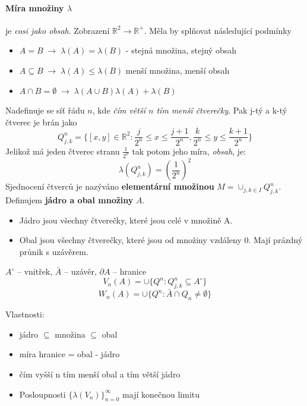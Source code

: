\documentclass[a4paper, twoside,%
12pt]{article}
\newcommand{\R}{\mathbb{R}}
\begin{document}
\paragraph{Míra množiny $\lambda$} je \emph{cosi jako obsah}. Zobrazení $\R^2 \to \R^+$. Měla by splňovat následující podmínky
\begin{itemize}
    \item $A=B\; \rightarrow \; \lambda(A) = \lambda(B)$ - stejná množina, stejný obsah
    \item $A\subseteq B\; \rightarrow \; \lambda(A) \leq \lambda(B)$ menší množina, menší obsah
    \item $A\cap B = \emptyset\; \rightarrow \; \lambda(A\cup B ) \lambda(A) + \lambda(B)$
\end{itemize}
Nadefinuje se síť řádu $n$, kde \emph{čím větší $n$ tím menší čtverečky}. Pak j-tý a k-tý čtverec je brán jako
$$ Q_{j,k}^n = \lbrace [x,y]\in \R^2: \frac{j}{2^n} \leq x \leq \frac{j+1}{2^n}, \frac{k}{2^n} \leq y \leq \frac{k+1}{2^n}\rbrace $$
Jelikož má jeden čtverec stranu $\frac{1}{2^n}$ tak potom jeho míra, \emph{obsah}, je:
$$\lambda(Q_{j,k}^n ) = \left(\frac{1}{2^n}\right)^2$$
Sjednocení čtverců je nazýváno \textbf{elementární množinou} $M = \cup_{j,k\in I} Q_{j,k}^n$.
Definujem \textbf{jádro a obal množiny} $A$. 
\begin{itemize}
    \item Jádro jsou všechny čtverečky, které jsou celé v množině A.
    \item Obal jsou všechny čtverečky, které jsou od množiny vzdáleny 0. Mají prázdný průnik s uzávěrem.
\end{itemize} 
$A^\circ$ -- vnitřek, $\bar A$ -- uzávěr, $\partial A$ -- hranice
$$ V_n (A) = \cup \lbrace  Q^n: Q_{j,k}^n \subseteq A^\circ \rbrace $$
$$ W_n (A) = \cup \lbrace  Q^n: \bar A \cap Q_n \neq \emptyset \rbrace $$
\begin{small}
Vlastnosti:
\begin{itemize}
    \item jádro $\subseteq$ množina $\subseteq$ obal
    \item míra hranice = obal - jádro
    \item čím vyšší n tím menší obal a tím větší jádro
\end{itemize}
\end{small}
\begin{itemize}
    \item Posloupnosti  $\lbrace\lambda(V_n)  \rbrace_{n=0}^\infty$ mají konečnou limitu
\end{itemize}
\end{document}
